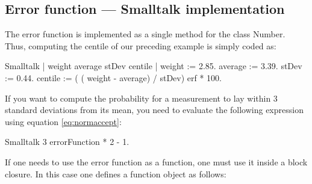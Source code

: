 \subsection{Error function --- Smalltalk implementation}
\label{sec:sterrorfunction}  The error function is
implemented as a single method for the class Number. Thus,
computing the centile of our preceding example is simply coded as:
\begin{listing}{Smalltalk}
| weight average stDev centile |
weight := 2.85.
average := 3.39.
stDev := 0.44.
centile := ( ( weight - average) / stDev) erf * 100.
\end{listing}
If you want to compute the probability for a measurement to lay
within 3 standard deviations from its mean, you need to evaluate
the following expression using equation \ref{eq:normaccept}:
\begin{listing}{Smalltalk}
3 errorFunction * 2 - 1.
\end{listing}
If one needs to use the error function as a function, one must use
it inside a block closure. In this case one defines a function
object as follows:
